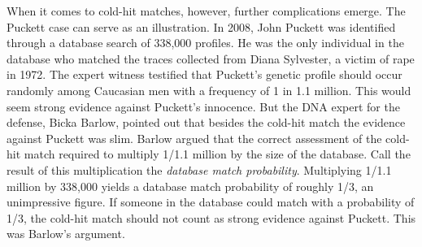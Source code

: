 \documentclass{article}
\begin{document}
   
  When it comes to cold-hit matches, however,  further complications emerge. %
  The Puckett case can serve as an illustration. In 2008, John Puckett was identified through a database search of 338,000 profiles. He was the only individual in the database who matched the traces collected from Diana Sylvester, a victim of rape  in 1972. The expert witness testified that %
Puckett's genetic profile 
should occur randomly among Caucasian men with a frequency of 1 in 1.1 million. This would seem strong evidence against Puckett's innocence. 
But the DNA expert  for the defense, Bicka Barlow,  pointed out that 
besides the cold-hit match the evidence against Puckett was slim. 
Barlow argued
that the correct assessment of  the cold-hit match required to multiply 1/1.1 million  by the size of the database. Call the result of this multiplication the \textit{database match probability}. Multiplying 1/1.1 million by 338,000 yields a database match probability of roughly 1/3, an unimpressive figure.  %
If someone in the database could match with a probability of 1/3, the cold-hit match should not count as strong evidence against Puckett. This was Barlow's argument. 




\end{document}
